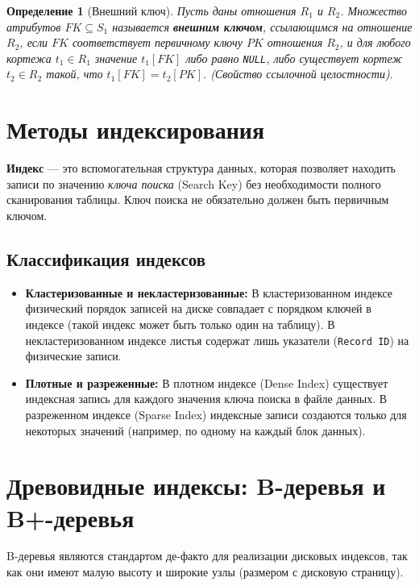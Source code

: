 \documentclass[12pt, a4paper]{article}
\newtheorem{definition}{Определение}
\begin{document}
\begin{definition}[Внешний ключ]
Пусть даны отношения $R_1$ и $R_2$. Множество атрибутов $FK \subseteq S_1$ называется \textbf{внешним ключом}, ссылающимся на отношение $R_2$, если $FK$ соответствует первичному ключу $PK$ отношения $R_2$, и для любого кортежа $t_1 \in R_1$ значение $t_1[FK]$ либо равно \texttt{NULL}, либо существует кортеж $t_2 \in R_2$ такой, что $t_1[FK] = t_2[PK]$. (Свойство ссылочной целостности).
\end{definition}

\section{Методы индексирования}

\textbf{Индекс} --- это вспомогательная структура данных, которая позволяет находить записи по значению \textit{ключа поиска} (Search Key) без необходимости полного сканирования таблицы. Ключ поиска не обязательно должен быть первичным ключом.

\subsection{Классификация индексов}
\begin{itemize}
    \item \textbf{Кластеризованные и некластеризованные:} В кластеризованном индексе физический порядок записей на диске совпадает с порядком ключей в индексе (такой индекс может быть только один на таблицу). В некластеризованном индексе листья содержат лишь указатели (\texttt{Record ID}) на физические записи.
    \item \textbf{Плотные и разреженные:} В плотном индексе (Dense Index) существует индексная запись для каждого значения ключа поиска в файле данных. В разреженном индексе (Sparse Index) индексные записи создаются только для некоторых значений (например, по одному на каждый блок данных).
\end{itemize}

\section{Древовидные индексы: B-деревья и B+-деревья}

B-деревья являются стандартом де-факто для реализации дисковых индексов, так как они имеют малую высоту и широкие узлы (размером с дисковую страницу).
\end{document}
